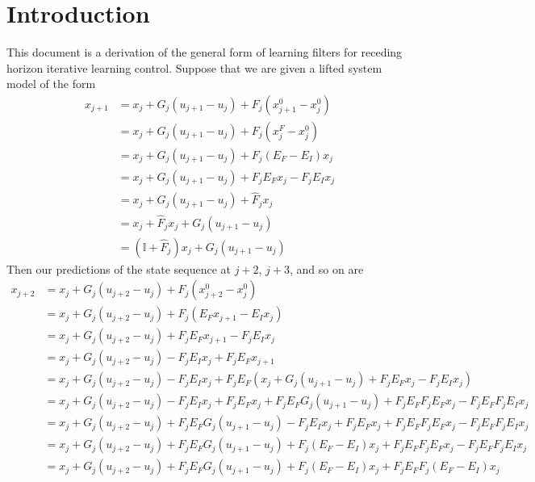 \documentclass[landscape]{article}
\begin{document}
\section{Introduction}
This document is a derivation of the general form of learning filters for receding horizon iterative learning control.  Suppose that we are given a lifted system model of the form
\begin{align}
x_{j+1} 
& = x_j + G_j(u_{j+1} - u_j) + F_j \left(x^0_{j+1} - x^0_j\right)\\
& = x_j + G_j(u_{j+1} - u_j) + F_j \left(x^F_{j} - x^0_j\right)\\
& = x_j + G_j(u_{j+1} - u_j) + F_j \left(E_F-E_I\right)x_j\\
& = x_j + G_j(u_{j+1} - u_j) + F_j E_F x_j - F_j E_I x_j\\
& = x_j + G_j(u_{j+1} - u_j) + \hat{F}_j x_j\\
& = x_j + \hat{F}_j x_j + G_j(u_{j+1} - u_j) \\
& = \left(\mathbb{I}+\hat{F}_j\right)x_j + G_j(u_{j+1} - u_j)
\end{align}
Then our predictions of the state sequence at $j+2$, $j+3$, and so on are
\begin{align}
x_{j+2} 
& = x_j + G_j(u_{j+2}-u_j) + F_j \left(x^0_{j+2}-x^0_{j}\right)\\
& = x_j + G_j(u_{j+2}-u_j) + F_j \left(E_F x_{j+1}-E_I x_{j}\right)\\
& = x_j + G_j(u_{j+2}-u_j) + F_j E_F x_{j+1} - F_j E_I x_{j}\\
& = x_j + G_j(u_{j+2}-u_j) - F_j E_I x_{j}   + F_j E_F x_{j+1}\\
& = x_j + G_j(u_{j+2}-u_j) - F_j E_I x_{j}   + F_j E_F \left(x_j + G_j(u_{j+1} - u_j) + F_j E_F x_j - F_j E_I x_j\right)\\
& = x_j + G_j(u_{j+2}-u_j) - F_j E_I x_{j}   + F_j E_F x_j + F_j E_F G_j(u_{j+1} - u_j) + F_j E_F F_j E_F x_j - F_j E_F F_j E_I x_j\\
& = x_j + G_j(u_{j+2}-u_j) + F_j E_F G_j(u_{j+1} - u_j) - F_j E_I x_{j}   + F_j E_F x_j + F_j E_F F_j E_F x_j - F_j E_F F_j E_I x_j\\
& = x_j + G_j(u_{j+2}-u_j) + F_j E_F G_j(u_{j+1} - u_j) + F_j \left( E_F -E_I \right) x_{j} + F_j E_F F_j E_F x_j - F_j E_F F_j E_I x_j\\
& = x_j + G_j(u_{j+2}-u_j) + F_j E_F G_j(u_{j+1} - u_j) + F_j \left( E_F -E_I \right) x_{j} + F_j E_F F_j \left( E_F - E_I \right) x_j
\end{align}
\end{document}
